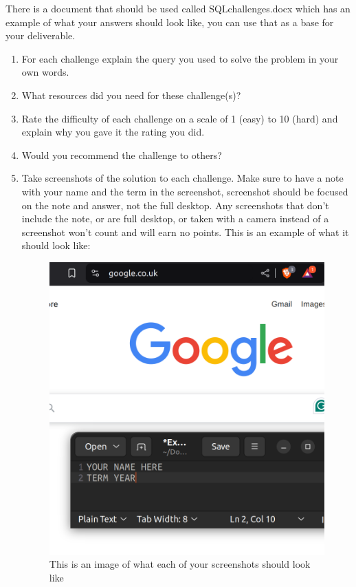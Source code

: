 \documentclass[12pt]{article}
\begin{document}
There is a document that should be used called SQLchallenges.docx which has an example of what your answers should look like, you can use that as a base for your deliverable.
    \begin{enumerate}
        \item For each challenge explain the query you used to solve the problem in your own words.
        \item What resources did you need for these challenge(s)?
        \item Rate the difficulty of each challenge on a scale of 1 (easy) to 10 (hard) and explain why you gave it the rating you did.
        \item Would you recommend the challenge to others? 
        \item Take screenshots of the solution to each challenge. Make sure to have a note with your name and the term in the screenshot, screenshot should be focused on the note and answer, not the full desktop.  Any screenshots that don't include the note, or are full desktop, or taken with a camera instead of a screenshot won't count and will earn no points. This is an example of what it should look like:        
 
        \begin{figure}[h!]
            \centerline{\includegraphics[scale=.2]{ExampleScreenshot.png}}
            \caption{This is an image of what each of your screenshots should look like}

            \end{figure} 
    \end{enumerate}
\end{document}

